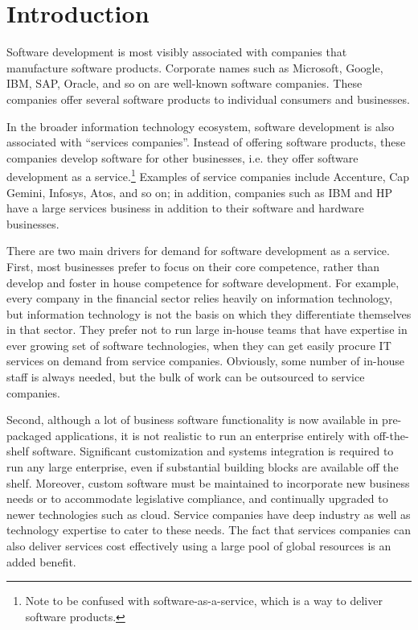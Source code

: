 \section{Introduction}

Software development is most visibly associated with companies that manufacture software products.  Corporate names such as Microsoft, Google, IBM, SAP, Oracle, and so on are well-known software companies.  These companies offer several software  products to individual consumers and businesses.

In the broader information technology ecosystem, software development is also associated with ``services companies''.  Instead of offering software products, these companies develop software for other businesses, i.e. they offer software development as a service.\footnote{Note to be confused with software-as-a-service, which is a way to deliver software products.} Examples of service companies include Accenture, Cap Gemini, Infosys, Atos, and so on; in addition, companies such as IBM and HP have a large services business in addition to their software and hardware businesses.

There are two main drivers for demand for software development as a service.  First, most businesses prefer to focus on their core competence, rather than develop and foster in house competence for software development.  For example, every company in the financial sector relies heavily on information technology, but information technology is not the basis on which they differentiate themselves in that sector. They prefer not to run large in-house teams that have expertise in ever growing set of software technologies, when they can get easily procure IT services on demand from service companies. Obviously, some number of in-house staff is always needed, but the bulk of work can be outsourced to service companies.

Second, although a lot of business software functionality is now available in pre-packaged applications, it is not realistic to run an enterprise entirely with off-the-shelf software. Significant customization and systems integration is required to run any large enterprise, even if substantial building blocks are available off the shelf. Moreover, custom software must be maintained to incorporate new business needs or to accommodate legislative compliance, and continually upgraded to newer technologies such as cloud. Service companies have deep industry as well as technology expertise to cater to these needs. The fact that services companies can also deliver services cost effectively using a large pool of global resources is an added benefit. 

